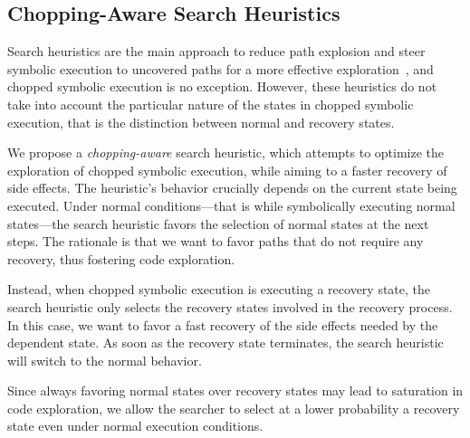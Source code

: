 
\subsection{Chopping-Aware Search Heuristics}
\label{Se:Search}

Search heuristics are the main approach to reduce path explosion and
steer symbolic execution to uncovered paths for a more effective
exploration~\cite{exe,klee,sen:concolicheuristics,fitsymex:dsn09}, and
chopped symbolic execution is no exception. However, these heuristics
do not take into account the particular nature of the states in
chopped symbolic execution, that is the distinction between normal and
recovery states.

We propose a \textit{chopping-aware} search heuristic, which attempts
to optimize the exploration of chopped symbolic execution, while
aiming to a faster recovery of side effects. The heuristic's behavior
crucially depends on the current state being executed. Under normal
conditions---that is while symbolically executing normal states---the
search heuristic favors the selection of normal states at the next
steps. The rationale is that we want to favor paths that do not
require any recovery, thus fostering code exploration.

Instead, when chopped symbolic execution is executing a recovery
state, the search heuristic only selects the recovery states involved
in the recovery process. In this case, we want to favor a fast
recovery of the side effects needed by the dependent state. As soon as
the recovery state terminates, the search heuristic will switch to the
normal behavior.

Since always favoring normal states over recovery states may lead to
saturation in code exploration, we allow the searcher to select at a
lower probability a recovery state even under normal execution
conditions.

